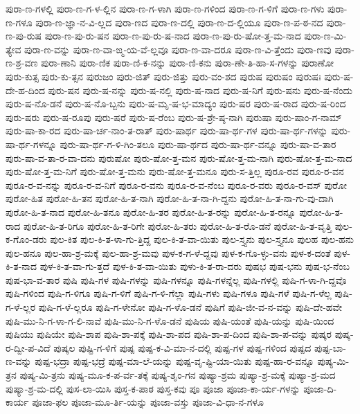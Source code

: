 {ಪುರಾ-ಣ-ಗಳಲ್ಲಿ
ಪುರಾ-ಣ-ಗ-ಳ-ಲ್ಲಿನ
ಪುರಾ-ಣ-ಗ-ಳಾಗಿ
ಪುರಾ-ಣ-ಗಳಿಂದ
ಪುರಾ-ಣ-ಗ-ಳಿಗೆ
ಪುರಾ-ಣ-ಗಳು
ಪುರಾ-ಣ-ಗಳೂ
ಪುರಾ-ಣ-ಜ್ಞಾ-ನ-ವಿ-ಲ್ಲದ
ಪುರಾ-ಣದ
ಪುರಾ-ಣ-ದಲ್ಲಿ
ಪುರಾ-ಣ-ದ-ಲ್ಲಿಯೂ
ಪುರಾ-ಣ-ಪ-ಠ-ನದ
ಪುರಾ-ಣ-ಪು-ರುಷ
ಪುರಾ-ಣ-ಪು-ರು-ಷನ
ಪುರಾ-ಣ-ಪು-ರು-ಷ-ನಾದ
ಪುರಾ-ಣ-ಪು-ರು-ಷೋ-ತ್ತ-ಮ-ನಾದ
ಪುರಾ-ಣ-ಮಿ-ತ್ಯೇವ
ಪುರಾ-ಣ-ವನ್ನು
ಪುರಾ-ಣ-ವಾ-ಙ್ಮ-ಯ-ವೆ-ಲ್ಲವೂ
ಪುರಾ-ಣ-ವಾ-ದರೂ
ಪುರಾ-ಣ-ವಿ-ತ್ತೆಂದು
ಪುರಾ-ಣವು
ಪುರಾ-ಣ-ಶ್ರ-ವಣ
ಪುರಾ-ಣಾನಿ
ಪುರಾ-ಣಿಕ
ಪುರಾ-ಣಿ-ಕ-ನನ್ನು
ಪುರಾ-ಣಿ-ಕನು
ಪುರಾ-ಣೇ-ತಿ-ಹಾ-ಸ-ಗಳನ್ನು
ಪುರಾಣೋ
ಪುರು-ಕುತ್ಸ
ಪುರು-ಕು-ತ್ಸನ
ಪುರುಜಂ
ಪುರು-ಜಿತ್
ಪುರು-ಜಿತ್ತು
ಪುರು-ವಂ-ಶದ
ಪುರುಷ
ಪುರುಷಂ
ಪುರುಷಃ
ಪುರು-ಷ-ದೇ-ಹ-ದಿಂದ
ಪುರು-ಷನ
ಪುರು-ಷ-ನನ್ನು
ಪುರು-ಷ-ನಲ್ಲಿ
ಪುರು-ಷ-ನಾದ
ಪುರು-ಷ-ನಿಗೆ
ಪುರು-ಷನು
ಪುರು-ಷ-ನೆಂದು
ಪುರು-ಷ-ನೊ-ಡನೆ
ಪುರು-ಷ-ನೊ-ಬ್ಬನು
ಪುರು-ಷ-ಮೃ-ಷ-ಭ-ಮಾದ್ಯಂ
ಪುರು-ಷರ
ಪುರು-ಷ-ರಾದ
ಪುರು-ಷ-ರಿಂದ
ಪುರು-ಷರು
ಪುರು-ಷ-ರೂಪು
ಪುರು-ಷರೆ
ಪುರು-ಷ-ರೆಂಬ
ಪುರು-ಷ-ಶ್ರೇ-ಷ್ಠ-ನಾಗಿ
ಪುರುಷಾ
ಪುರು-ಷಾಂ-ಗ-ನಾಮ್
ಪುರು-ಷಾ-ಕಾ-ರದ
ಪುರು-ಷಾ-ರ್ಚ-ನಾಂ-ತ-ರಾತ್
ಪುರು-ಷಾರ್ಥ
ಪುರು-ಷಾ-ರ್ಥ-ಗಳ
ಪುರು-ಷಾ-ರ್ಥ-ಗಳನ್ನು
ಪುರು-ಷಾ-ರ್ಥ-ಗಳನ್ನೂ
ಪುರು-ಷಾ-ರ್ಥ-ಗ-ಳಿ-ಗಿಂ-ತಲೂ
ಪುರು-ಷಾ-ರ್ಥದ
ಪುರು-ಷಾ-ರ್ಥ-ವನ್ನೂ
ಪುರು-ಷಾ-ವ-ತಾರ
ಪುರು-ಷಾ-ವ-ತಾ-ರ-ವಾ-ದನು
ಪುರುಷೋ
ಪುರು-ಷೋ-ತ್ತ-ಮನ
ಪುರು-ಷೋ-ತ್ತ-ಮ-ನಾಗಿ
ಪುರು-ಷೋ-ತ್ತ-ಮ-ನಾದ
ಪುರು-ಷೋ-ತ್ತ-ಮ-ನಿಗೆ
ಪುರು-ಷೋ-ತ್ತ-ಮನು
ಪುರು-ಷೋ-ತ್ತ-ಮನೂ
ಪುರು-ಸ-ತ್ತಿಲ್ಲ
ಪುರೂ-ರವ
ಪುರೂ-ರ-ವನ
ಪುರೂ-ರ-ವ-ನನ್ನು
ಪುರೂ-ರ-ವ-ನಿಗೆ
ಪುರೂ-ರ-ವನು
ಪುರೂ-ರ-ವ-ನೆಂಬ
ಪುರೂ-ರ-ವರು
ಪುರೂ-ರ-ವಸ್
ಪುರೋ
ಪುರೋ-ಹಿತ
ಪುರೋ-ಹಿ-ತನ
ಪುರೋ-ಹಿ-ತ-ನಾಗಿ
ಪುರೋ-ಹಿ-ತ-ನಾ-ಗಿ-ದ್ದನು
ಪುರೋ-ಹಿ-ತ-ನಾ-ಗು-ವು-ದಾಗಿ
ಪುರೋ-ಹಿ-ತ-ನಾದ
ಪುರೋ-ಹಿ-ತನೂ
ಪುರೋ-ಹಿ-ತರ
ಪುರೋ-ಹಿ-ತ-ರನ್ನು
ಪುರೋ-ಹಿ-ತ-ರನ್ನೂ
ಪುರೋ-ಹಿ-ತ-ರಾದ
ಪುರೋ-ಹಿ-ತ-ರಿಗೂ
ಪುರೋ-ಹಿ-ತ-ರಿಗೇ
ಪುರೋ-ಹಿ-ತರು
ಪುರೋ-ಹಿ-ತ-ರೊ-ಡನೆ
ಪುರೋ-ಹಿ-ತ-ವೃತ್ತಿ
ಪುಲ-ಕ-ಗೊಂ-ಡರು
ಪುಲ-ಕಿತ
ಪುಲ-ಕಿ-ತ-ಳಾ-ಗು-ತ್ತಿದ್ದ
ಪುಲ-ಕಿ-ತ-ವಾ-ಯಿತು
ಪುಲ-ಸ್ತ್ಯನು
ಪುಲ-ಸ್ತ್ಯನೂ
ಪುಲಹ
ಪುಲ-ಹನು
ಪುಲ-ಹನೂ
ಪುಲ-ಹಾ-ಶ್ರ-ಮಕ್ಕೆ
ಪುಲ-ಹಾ-ಶ್ರ-ಮವು
ಪುಳ-ಕ-ಗ-ಳೆ-ದ್ದವು
ಪುಳ-ಕ-ಗೊ-ಳ್ಳು-ವನು
ಪುಳ-ಕ-ದಂತೆ
ಪುಳ-ಕಿ-ತ-ನಾದ
ಪುಳ-ಕಿ-ತ-ವಾ-ಗು-ತ್ತದೆ
ಪುಳ-ಕಿ-ತ-ವಾ-ಯಿತು
ಪುಳು-ಕಿ-ತ-ರಾ-ದರು
ಪುಷಭ
ಪುಷ-ಭನು
ಪುಷ-ಭ-ನೆಂಬ
ಪುಷ-ಭಾ-ವ-ತಾರ
ಪುಷಿ
ಪುಷಿ-ಗಳ
ಪುಷಿ-ಗಳನ್ನು
ಪುಷಿ-ಗಳನ್ನೂ
ಪುಷಿ-ಗಳನ್ನೆಲ್ಲ
ಪುಷಿ-ಗಳಲ್ಲಿ
ಪುಷಿ-ಗ-ಳಾ-ಗಿ-ದ್ದವೊ
ಪುಷಿ-ಗಳಿಂದ
ಪುಷಿ-ಗ-ಳಿಗೂ
ಪುಷಿ-ಗ-ಳಿಗೆ
ಪುಷಿ-ಗ-ಳಿ-ಗೆಲ್ಲಾ
ಪುಷಿ-ಗಳು
ಪುಷಿ-ಗಳೂ
ಪುಷಿ-ಗಳೆ
ಪುಷಿ-ಗ-ಳೆಲ್ಲ
ಪುಷಿ-ಗ-ಳೆ-ಲ್ಲರ
ಪುಷಿ-ಗ-ಳೆ-ಲ್ಲರೂ
ಪುಷಿ-ಗ-ಳೇನೋ
ಪುಷಿ-ಗ-ಳೊ-ಡನೆ
ಪುಷಿಗೆ
ಪುಷಿ-ಜೀ-ವ-ನ-ವನ್ನು
ಪುಷಿ-ದೇ-ಹವೇ
ಪುಷಿ-ಮು-ನಿ-ಗ-ಳಾ-ಗ-ಲಿ-ನಾವೆ
ಪುಷಿ-ಮು-ನಿ-ಗ-ಳೊ-ಡನೆ
ಪುಷಿಯ
ಪುಷಿ-ಯಂತೆ
ಪುಷಿ-ಯನ್ನು
ಪುಷಿ-ಯಿಂದ
ಪುಷಿಯು
ಪುಷಿಯೇ
ಪುಷಿ-ಶಾಪ
ಪುಷಿ-ಶಾ-ಪಕ್ಕೆ
ಪುಷಿ-ಶಾ-ಪದ
ಪುಷಿ-ಶಾ-ಪ-ದಿಂದ
ಪುಷಿ-ಶಾ-ಪ-ವನ್ನು
ಪುಷ್ಕರ
ಪುಷ್ಕ-ರ-ದ್ವೀ-ಪ-ವಿದೆ
ಪುಷ್ಕಲ
ಪುಷ್ಟಿ-ಗ-ಳಿಗೆ
ಪುಷ್ಪ
ಪುಷ್ಪ-ಕ-ವಿ-ಮಾ-ನ-ದಲ್ಲಿ
ಪುಷ್ಪ-ಗಳ
ಪುಷ್ಪ-ಗಳಿಂದ
ಪುಷ್ಪದ
ಪುಷ್ಪ-ಬಾ-ಣ-ವನ್ನು
ಪುಷ್ಪ-ಭದ್ರಾ
ಪುಷ್ಪ-ಭದ್ರೆ
ಪುಷ್ಪ-ಮಾ-ಲೆ-ಯನ್ನು
ಪುಷ್ಪ-ವೃ-ಷ್ಟಿ-ಯಾ-ಯಿತು
ಪುಷ್ಪ-ಹಾ-ರ-ವನ್ನೂ
ಪುಷ್ಯ-ಮಿ-ತ್ರನ
ಪುಷ್ಯ-ಮಿ-ತ್ರನು
ಪುಷ್ಯ-ಮೂ-ಕ-ಪ-ರ್ವ-ತಕ್ಕೆ
ಪುಷ್ಯ-ಶೃಂ-ಗನ
ಪುಷ್ಯಾ-ಶ್ರಮ
ಪುಷ್ಯಾ-ಶ್ರ-ಮಕ್ಕೆ
ಪುಷ್ಯಾ-ಶ್ರ-ಮದ
ಪುಷ್ಯಾ-ಶ್ರ-ಮ-ದಲ್ಲಿ
ಪುಸ-ಲಾ-ಯಿಸಿ
ಪುಸ್ತ-ಕ-ಪಾಠ
ಪುಸ್ತ-ಕವು
ಪೂ
ಪೂಜಾ
ಪೂಜಾ-ಕಾ-ರ್ಯ-ಗಳನ್ನು
ಪೂಜಾ-ದಿ-ಕಾರ್ಯ
ಪೂಜಾ-ಫಲ
ಪೂಜಾ-ಮೂ-ರ್ತಿ-ಯನ್ನು
ಪೂಜಾ-ವಸ್ತು
ಪೂಜಾ-ವಿ-ಧಾ-ನ-ಗಳೂ
}
